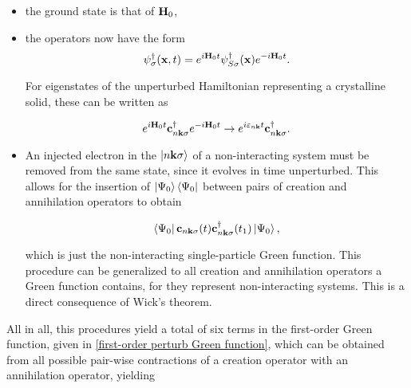 \begin{itemize}
    \item the ground state is that of ${\bf H}_0$, 
    \item the operators now have the form
          $$
            \psi_\sigma^\dagger({\bf x},t) = e^{i {\bf H}_0 t} \psi_{S \sigma}^\dagger({\bf x}) e^{-i {\bf H}_0 t}.
          $$
          
          For eigenstates of the unperturbed Hamiltonian representing a crystalline solid, these can be written as 
          
           $$
            e^{i {\bf H}_0 t} {\bf c}_{n {\bf k} \sigma}^\dagger e^{-i {\bf H}_0 t} \rightarrow e^{i \varepsilon_{n {\bf k}} t}{\bf c}_{n {\bf k} \sigma}^\dagger.
          $$
          
    \item An injected electron in the $\ket{n {\bf k} \sigma}$ of a non-interacting system must be removed from the same state, since it evolves in time unperturbed. This allows for the insertion of $\ket{\Psi_0}\bra{\Psi_0}$ between pairs of creation and annihilation operators to obtain
    
    $$
        \bra{\Psi_0} {{\bf c}}_{n {{\bf k}} \sigma}(t) {{\bf c}}_{n {{\bf k}} \sigma}^\dagger(t_1) \ket{\Psi_0},
    $$
    
    which is just the non-interacting single-particle Green function. This procedure can be generalized to all creation and annihilation operators a Green function contains, for they represent non-interacting systems. This is a direct consequence of Wick's theorem. 
    
\end{itemize}

All in all, this procedures yield a total of six terms in the first-order Green function, given in \cref{first-order perturb Green function}, which can be obtained from all possible pair-wise contractions of a creation operator with an annihilation operator, yielding 

